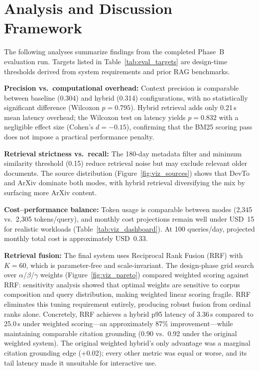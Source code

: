 \section{Analysis and Discussion Framework}
\label{sec:discussion}

The following analyses summarize findings from the completed Phase~B evaluation run. Targets listed in Table~\ref{tab:eval_targets} are design-time thresholds derived from system requirements and prior RAG benchmarks.

\textbf{Precision vs.\ computational overhead:} Context precision is comparable between baseline (0.304) and hybrid (0.314) configurations, with no statistically significant difference (Wilcoxon $p = 0.795$). Hybrid retrieval adds only 0.21\,s mean latency overhead; the Wilcoxon test on latency yields $p = 0.832$ with a negligible effect size (Cohen's $d = -0.15$), confirming that the BM25 scoring pass does not impose a practical performance penalty.

\textbf{Retrieval strictness vs.\ recall:} The 180-day metadata filter and minimum similarity threshold (0.15) reduce retrieval noise but may exclude relevant older documents. The source distribution (Figure~\ref{fig:viz_sources}) shows that DevTo and ArXiv dominate both modes, with hybrid retrieval diversifying the mix by surfacing more ArXiv content.

\textbf{Cost--performance balance:} Token usage is comparable between modes (2{,}345 vs.\ 2{,}305 tokens/query), and monthly cost projections remain well under USD~15 for realistic workloads (Table~\ref{tab:viz_dashboard}). At 100 queries/day, projected monthly total cost is approximately USD~0.33.

\textbf{Retrieval fusion:} The final system uses Reciprocal Rank Fusion (RRF) with $K = 60$, which is parameter-free and scale-invariant. The design-phase grid search over $\alpha$/$\beta$/$\gamma$ weights (Figure~\ref{fig:viz_pareto}) compared weighted scoring against RRF: sensitivity analysis showed that optimal weights are sensitive to corpus composition and query distribution, making weighted linear scoring fragile. RRF eliminates this tuning requirement entirely, producing robust fusion from ordinal ranks alone. Concretely, RRF achieves a hybrid p95 latency of 3.36\,s compared to 25.0\,s under weighted scoring---an approximately 87\% improvement---while maintaining comparable citation grounding (0.90 vs.\ 0.92 under the original weighted system). The original weighted hybrid's only advantage was a marginal citation grounding edge (+0.02); every other metric was equal or worse, and its tail latency made it unsuitable for interactive use.

